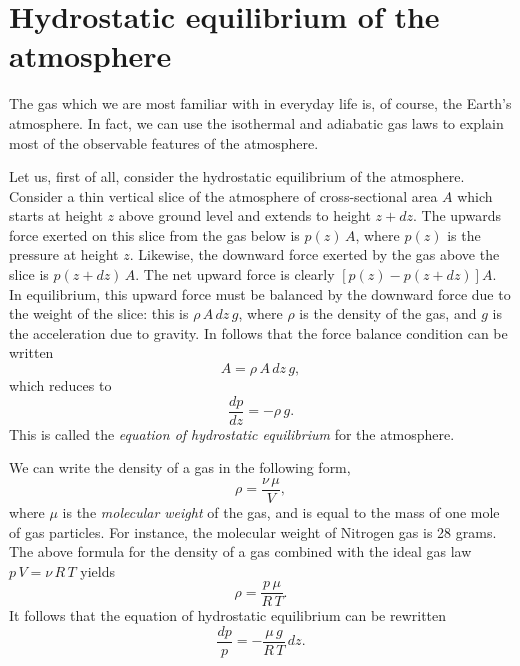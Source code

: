 \section{Hydrostatic equilibrium of the atmosphere}
The gas which we are most familiar with in everyday life is, of course, the Earth's
atmosphere. In fact, we can use the isothermal 
and adiabatic gas laws to
explain most of the observable
 features of the atmosphere. 

Let us, first of all, consider the hydrostatic equilibrium of the atmosphere.
Consider a thin vertical slice
of the atmosphere of cross-sectional area $A$ which starts at height $z$ above 
ground level and extends to
height $z+dz$. The upwards force exerted on this slice from the gas below 
is $p(z)\,A$, where $p(z)$ is the pressure at height $z$.
 Likewise, the downward force exerted by the gas above the slice is
$p(z+dz)\,A$. The net upward force is clearly $[p(z) - p(z+dz)]A$. In equilibrium,
this upward force must be balanced by the downward force due to the weight of
 the slice: this is $\rho\,A\,dz\,g$, where $\rho$ is the density of
the gas, and $g$ is the acceleration due to gravity. In follows that the
 force balance condition can be written
\begin{equation}
[p(z)- p(z+dz)]A = \rho \,A\,dz\,g,
\end{equation}
which reduces to
\begin{equation}
\frac{dp}{d z} = - \rho \,g.
\end{equation}
This is called the {\em equation of hydrostatic equilibrium}\/ for the atmosphere.

We can write the density of a gas in the following form,
\begin{equation}
\rho = \frac{\nu \,\mu}{V},
\end{equation}
where $\mu$ is the {\em molecular weight}\/ of the gas, 
and is equal to the mass of one mole of gas particles.
For instance, the molecular weight of Nitrogen gas is 28 grams.
 The above formula for the density of a gas
combined with the ideal gas law $p\,V= \nu \,R\,T$ yields
\begin{equation}
\rho = \frac{p\,\mu}{R\,T}.\label{e6.65}
\end{equation}
It follows that the equation of hydrostatic equilibrium can be rewritten
\begin{equation}
\frac{dp}{p} = -\frac{\mu\, g}{R\,T} \,dz.\label{e6.66}
\end{equation}

